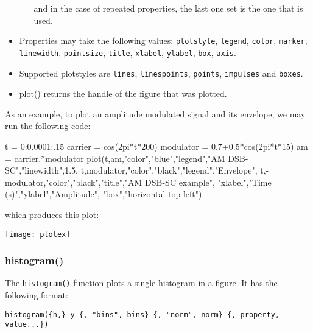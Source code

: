 \documentclass[11pt]{article}
\newcommand{\cmd}[1]{\texttt{#1}}
\begin{document}
\begin{itemize}
\begin{itemize}
				and in the case of repeated properties, the last one set is the
				one that is used.
		\end{itemize}
	\item Properties may take the following values: \cmd{plotstyle},
		\cmd{legend}, \cmd{color},
		\cmd{marker}, \cmd{linewidth}, \cmd{pointsize}, \cmd{title},
		\cmd{xlabel}, \cmd{ylabel}, \cmd{box}, \cmd{axis}.
	\item Supported plotstyles are \cmd{lines}, \cmd{linespoints},
		\cmd{points}, \cmd{impulses} and \cmd{boxes}.
	\item plot() returns the handle of the figure that was plotted.
\end{itemize}

As an example, to plot an amplitude modulated signal and its envelope, we may
run the following code:

\begin{juliacode}
t = 0:0.0001:.15
carrier = cos(2pi*t*200)
modulator = 0.7+0.5*cos(2pi*t*15)
am = carrier.*modulator
plot(t,am,"color","blue","legend","AM DSB-SC","linewidth",1.5,
    t,modulator,"color","black","legend","Envelope",
    t,-modulator,"color","black","title","AM DSB-SC example",
    "xlabel","Time (s)","ylabel","Amplitude",
    "box","horizontal top left")
\end{juliacode}

\noindent which produces this plot:

\begin{center}
\texttt{[image: plotex]}
\end{center}

\subsubsection{histogram()}

The \cmd{histogram()} function plots a single histogram in a figure. It has the
following format:

\cmd{histogram(\{h,\} y \{, "bins", bins\} \{, "norm", norm\}
\{, property, value...\})}
\end{document}
